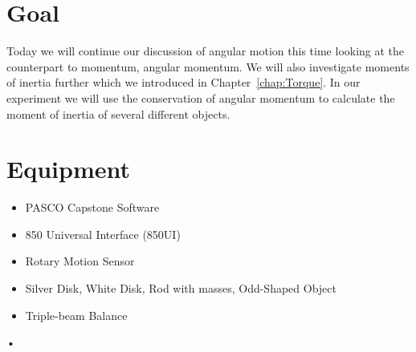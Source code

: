 \documentclass[main.tex]{subfiles}
\begin{document}
\section*{Goal}
Today we will continue our discussion of angular motion this time looking at the counterpart to momentum, angular momentum. We will also investigate moments of inertia further which we introduced in Chapter~\ref{chap:Torque}. In our experiment we will use the conservation of angular momentum to calculate the moment of inertia of several different objects.

\section*{Equipment}
\begin{itemize}
\item
PASCO Capstone Software
\item
850 Universal Interface (850UI)
\item
Rotary Motion Sensor
\item
Silver Disk, White Disk, Rod with masses, Odd-Shaped Object
\item
Triple-beam Balance
\end{itemize}•
\end{document}
